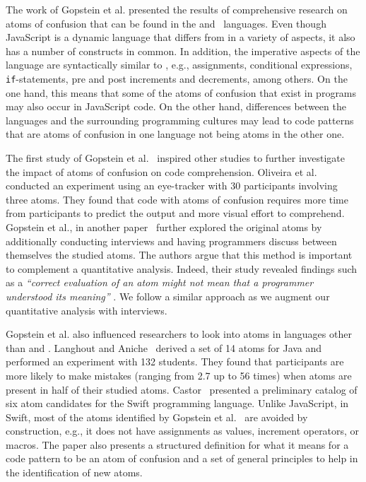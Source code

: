 The work of Gopstein et al. \cite{DBLP:conf/sigsoft/GopsteinIYDZYC17} presented the results of comprehensive research on atoms of confusion that can be found in the \clang and \cpplang~languages. Even though JavaScript is a dynamic language that differs from \clang in a variety of aspects, it also has a number of constructs in common. In addition, the imperative aspects of the language are syntactically similar to \clang, e.g., assignments, conditional expressions, \texttt{if}-statements, pre and post increments and decrements, among others. On the one hand, this means that some of the atoms of confusion that exist in \clang programs may also occur in JavaScript code. On the other hand, differences between the languages and the surrounding programming cultures may lead to code patterns that are atoms of confusion in one language not being atoms in the other one.  

The first study of Gopstein et al.~\cite{DBLP:conf/sigsoft/GopsteinIYDZYC17} inspired other studies to further investigate the impact of atoms of confusion on code comprehension.
Oliveira et al.~\cite{TheEyesDoNotLie} conducted an experiment using an eye-tracker with 30 participants involving three atoms.
They found that code with atoms of confusion requires more time from participants to predict the output and more visual effort to comprehend.
Gopstein et al., in another paper~\cite{ThinkingAloud} further explored the original atoms by additionally conducting interviews and having programmers discuss between themselves the studied atoms.
The authors argue that this method is important to complement a quantitative analysis.
Indeed, their study revealed findings such as a \textit{``correct evaluation of an atom might not mean that a programmer understood its meaning''
}.  We follow a similar approach as we augment our quantitative analysis with interviews.

Gopstein et al. also influenced researchers to look into atoms in languages other than \clang and \cpplang.
Langhout and Aniche~\cite{Langhout:2021:ACJ} derived a set of 14 atoms for Java and performed an experiment with 132 students. They found that participants are more likely to make mistakes (ranging from 2.7 up to 56 times) when atoms are present in half of their studied atoms.
Castor~\cite{castor2018} presented a preliminary catalog of six atom candidates for the Swift programming language. Unlike JavaScript, in Swift, most of the atoms identified by Gopstein et al.~\cite{DBLP:conf/sigsoft/GopsteinIYDZYC17} are avoided by construction, e.g., it does not have assignments as values, increment operators, or macros. The paper also presents a structured definition for what it means for a code pattern to be an atom of confusion and a set of general principles to help in the identification of new atoms.

